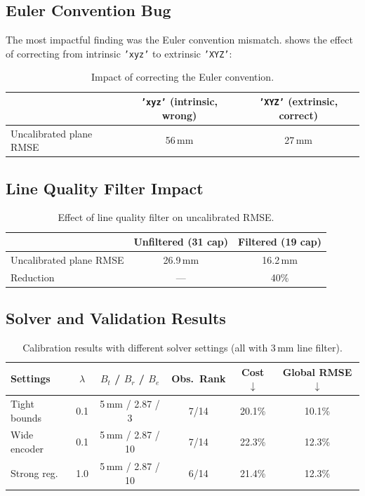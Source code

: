 \documentclass[12pt,a4paper]{article}
\newcommand{\code}[1]{\texttt{#1}}
\begin{document}
\subsection{Euler Convention Bug}

The most impactful finding was the Euler convention mismatch.
 shows the effect of correcting from intrinsic
\code{'xyz'} to extrinsic \code{'XYZ'}:

\begin{table}[H]
\centering
\caption{Impact of correcting the Euler convention.}
\label{tab:euler_bug}
\begin{tabular}{@{}lcc@{}}
\toprule
 & \code{'xyz'} (intrinsic, wrong) & \code{'XYZ'} (extrinsic, correct) \\
\midrule
Uncalibrated plane RMSE & 56\,mm & 27\,mm \\
\bottomrule
\end{tabular}
\end{table}

\subsection{Line Quality Filter Impact}

\begin{table}[H]
\centering
\caption{Effect of line quality filter on uncalibrated RMSE.}
\label{tab:filter_impact}
\begin{tabular}{@{}lcc@{}}
\toprule
 & Unfiltered (31 cap) & Filtered (19 cap) \\
\midrule
Uncalibrated plane RMSE & 26.9\,mm & 16.2\,mm \\
Reduction & --- & 40\% \\
\bottomrule
\end{tabular}
\end{table}

\subsection{Solver and Validation Results}

\begin{table}[H]
\centering
\caption{Calibration results with different solver settings
(all with 3\,mm line filter).}
\label{tab:solver_results}
\begin{tabular}{@{}lccccc@{}}
\toprule
Settings & $\lambda$ & $B_t$ / $B_r$ / $B_e$ & Obs.\ Rank
    & Cost $\downarrow$ & Global RMSE $\downarrow$ \\
\midrule
Tight bounds
    & 0.1 & 5\,mm / 2.87\textdegree{} / 3\textdegree{}
    & 7/14 & 20.1\% & 10.1\% \\
Wide encoder
    & 0.1 & 5\,mm / 2.87\textdegree{} / 10\textdegree{}
    & 7/14 & 22.3\% & 12.3\% \\
Strong reg.
    & 1.0 & 5\,mm / 2.87\textdegree{} / 10\textdegree{}
    & 6/14 & 21.4\% & 12.3\% \\
\bottomrule
\end{tabular}
\end{table}
\end{document}
